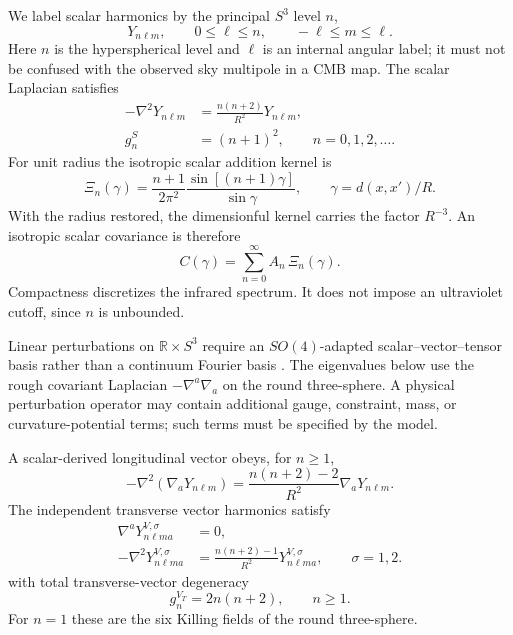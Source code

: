 \documentclass[
  aps,
  prd,
  reprint,
  superscriptaddress,
  nofootinbib,
  floatfix,
  longbibliography
]{revtex4-2}
\theoremstyle{plain}
\theoremstyle{definition}
\theoremstyle{remark}
\newcommand{\RR}{\mathbb R}
\begin{document}
We label scalar harmonics by the principal $S^3$ level $n$,
\[
Y_{n\ell m},\qquad 0\leq \ell\leq n,\qquad -\ell\leq m\leq \ell.
\]
Here $n$ is the hyperspherical level and $\ell$ is an internal angular label; it
must not be confused with the observed sky multipole in a CMB map.  The scalar
Laplacian satisfies \cite{RubinOrdonez1984}
\begin{align}
-\nabla^2Y_{n\ell m}
&=\frac{n(n+2)}{R^2}Y_{n\ell m},
\nonumber\\
g_n^S&=(n+1)^2,\qquad n=0,1,2,\ldots .
\label{eq:scalar_spectrum}
\end{align}
For unit radius the isotropic scalar addition kernel is
\begin{equation}
\Xi_n(\gamma)=\frac{n+1}{2\pi^2}
\frac{\sin[(n+1)\gamma]}{\sin\gamma},\qquad
\gamma=d(x,x')/R .
\label{eq:addition_kernel}
\end{equation}
With the radius restored, the dimensionful kernel carries the factor $R^{-3}$.
An isotropic scalar covariance is therefore
\begin{equation}
C(\gamma)=\sum_{n=0}^{\infty} A_n\,\Xi_n(\gamma).
\label{eq:covariance}
\end{equation}
Compactness discretizes the infrared spectrum.  It does not impose an
ultraviolet cutoff, since $n$ is unbounded.

Linear perturbations on $\RR\times S^3$ require an $SO(4)$-adapted
scalar--vector--tensor basis rather than a continuum Fourier basis
\cite{RubinOrdonez1984,Higuchi1987,AbbottSchaefer1986,Jantzen1978,LindblomTaylorZhang2017}.
The eigenvalues below use the rough covariant Laplacian $-\nabla^a\nabla_a$ on
the round three-sphere.  A physical perturbation operator may contain additional
gauge, constraint, mass, or curvature-potential terms; such terms must be
specified by the model.

A scalar-derived longitudinal vector obeys, for $n\geq1$,
\begin{equation}
-\nabla^2(\nabla_aY_{n\ell m})
=\frac{n(n+2)-2}{R^2}\nabla_aY_{n\ell m}.
\label{eq:long_vector_eigen}
\end{equation}
The independent transverse vector harmonics satisfy
\begin{align}
\nabla^aY^{V,\sigma}_{n\ell m a}&=0,
\nonumber\\
-\nabla^2Y^{V,\sigma}_{n\ell m a}
&=\frac{n(n+2)-1}{R^2}Y^{V,\sigma}_{n\ell m a},
\qquad \sigma=1,2.
\label{eq:trans_vector_eigen}
\end{align}
with total transverse-vector degeneracy
\begin{equation}
g_n^{V_T}=2n(n+2),\qquad n\geq1.
\label{eq:vector_degeneracy}
\end{equation}
For $n=1$ these are the six Killing fields of the round three-sphere.
\end{document}
